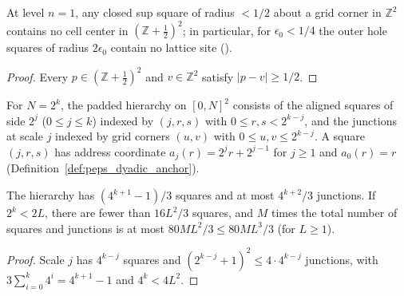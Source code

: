 \begin{lemma}
    \label{lem:peps_dyadic_last_level}
    \leanok
    At level $n=1$, any closed sup square of radius $<1/2$ about a grid corner in
    $\mathbb Z^2$ contains no cell center in $(\mathbb Z+\tfrac12)^2$; in
    particular, for $\epsilon_0<1/4$ the outer hole squares of radius
    $2\epsilon_0$ contain no lattice site
    (\cite[Section~7, lines 669--672]{OpenAI2026PolynomialPEPS}).
\end{lemma}

\begin{proof}\leanok
    Every $p\in(\mathbb Z+\tfrac12)^2$ and $v\in\mathbb Z^2$ satisfy
    $|p-v|\ge1/2$.
\end{proof}

\begin{definition}
    \label{def:peps_dyadic_hierarchy}
    \leanok
    For $N=2^k$, the padded hierarchy on $[0,N]^2$ consists of the aligned squares
    of side $2^j$ ($0\le j\le k$) indexed by $(j,r,s)$ with $0\le r,s<2^{k-j}$,
    and the junctions at scale $j$ indexed by grid corners $(u,v)$ with
    $0\le u,v\le2^{k-j}$. A square $(j,r,s)$ has address coordinate
    $a_j(r)=2^jr+2^{j-1}$ for $j\ge1$ and $a_0(r)=r$
    (Definition~\ref{def:peps_dyadic_anchor}).
\end{definition}

\begin{lemma}
    \label{thm:peps_dyadic_hierarchy_counts}
    \leanok
    The hierarchy has $(4^{k+1}-1)/3$ squares and at most $4^{k+2}/3$ junctions.
    If $2^k<2L$, there are fewer than $16L^2/3$ squares, and $M$ times the total
    number of squares and junctions is at most $80ML^2/3\le80ML^3/3$ (for
    $L\ge1$).
\end{lemma}

\begin{proof}\leanok
    Scale $j$ has $4^{k-j}$ squares and $(2^{k-j}+1)^2\le4\cdot4^{k-j}$ junctions,
    with $3\sum_{i=0}^k4^i=4^{k+1}-1$ and $4^k<4L^2$.
\end{proof}

